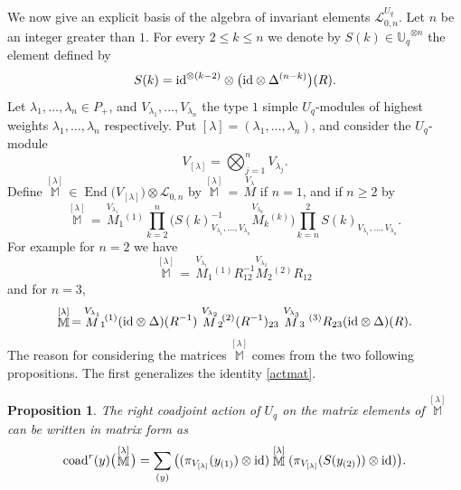 \documentclass[pdftex]{sigma}%
\numberwithin{equation}{section}
\numberwithin{figure}{section}
\newtheorem{prop}[teo]{Proposition}
\newcommand{\mUq}{\mathbb{U}_q}
\newcommand{\Ll}{{\mathcal L}}
\begin{document}
We now give an explicit basis of the algebra of invariant elements $\Ll_{0,n}^{U_q}$. Let $n$ be an integer greater than $1$. For every $2\leq k\leq n$ we denote by $S(k)\in {\mUq}^{{\otimes} n}$ the element defined by
\[
S(k)={\rm id}^{\otimes (k-2)} \otimes \big({\rm id} \otimes \Delta^{(n-k)}\big)(R).
\]
Let $\lambda_1,\dots,\lambda_n\in P_+$, and $V_{\lambda_1},\dots,V_{\lambda_n}$ the type $1$ simple $U_q$-modules of highest weights $\lambda_1,\dots,\lambda_n$ respectively. Put $[\lambda]=(\lambda_1,\dots,\lambda_n)$, and consider the $U_q$-module
\[
V_{[\lambda]}=\bigotimes_{j=1}^n V_{\lambda_j}.
\]
Define $\stackrel{[\lambda]}{\mathbb M}\,\in \operatorname{End}\big(V_{[\lambda]}\big)\otimes\Ll_{0,n}$ by $\stackrel{[\lambda]}{\mathbb M}\,=\,\stackrel{V_\lambda}{ M}$ if $n=1$, and if $n\geq 2$ by
\begin{equation}\label{Matrixlambda}
\stackrel{[\lambda]}{\mathbb M}\,=\, \stackrel{V_{\lambda_1}}{ M}_1{}^{\!\!\! (1)} \prod_{k=2}^{n}
\big(S(k)^{-1}_{V_{\lambda_1},\dots,V_{\lambda_n}}\stackrel{V_{\lambda_k}}{ M}_k{}^{\!\!\! (k)} \big)\prod_{k=n}^{2} S(k)_{V_{\lambda_1},\dots,V_{\lambda_n}} .
\end{equation}
For example for $n=2$ we have
\[
\stackrel{[\lambda]}{\mathbb M}\,=\,
\stackrel{V_{\lambda_1}}{M}_1{}^{\!\!\! (1)}R_{12}^{-1}\stackrel{V_{\lambda_2}}{M}_2{}^{\!\!\! (2)}R_{12}
\]
 and for $n=3$,
\[
\stackrel{[\lambda]}{\mathbb M}\,=\, \stackrel{V_{\lambda_1}}{M}_1{}^{\!\!\! (1)}({\rm id}\otimes \Delta )(R^{-1})\stackrel{V_{\lambda_2}}{M}_2{}^{\!\!\! (2)}
(R^{-1})_{23}\stackrel{V_{\lambda_3}}{M}_3{}^{(3)}R_{23}({\rm id}\otimes \Delta )(R).
\]
The reason for considering the matrices $\stackrel{[\lambda]}{\mathbb M}$ comes from the two following propositions. The first generalizes the identity \eqref{actmat}.
\begin{prop}\label{coadmat2} The right coadjoint action of $U_q$ on the matrix elements of $\stackrel{[\lambda]}{\mathbb M}$ can be written in matrix form as
\begin{equation}\label{actmat2}
\operatorname{coad}^r(y)\big(\!\stackrel{[\lambda]}{\mathbb M}\!\big) = \sum_{(y)}\big((\pi_{V_{[\lambda]}}(y_{(1)}) \otimes {\rm id} )
\stackrel{[\lambda]}{{\mathbb M}}(\pi_{V_{[\lambda]}}( S(y_{(2)})) \otimes {\rm id} )\big).
\end{equation}
\end{prop}
\end{document}
